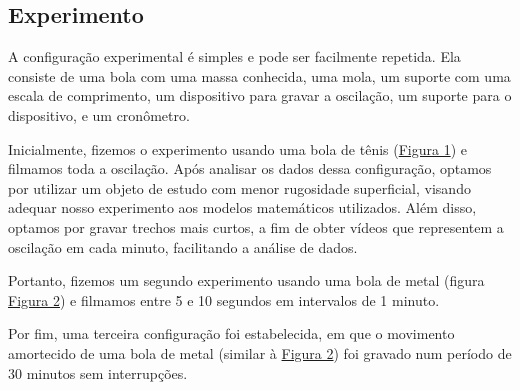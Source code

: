 \documentclass[a4paper, 12pt]{article}
\begin{document}
\begin{multicols}{2}
		\section{Experimento} \label{sec:experimento}
			\par A configuração experimental é simples e pode ser facilmente repetida. Ela consiste de uma bola com uma massa conhecida, uma mola, um suporte com uma escala de comprimento, um dispositivo para gravar a oscilação, um suporte para o dispositivo, e um cronômetro.
			\par Inicialmente, fizemos o experimento usando uma bola de tênis (\hyperref[img:tenis]{Figura 1}) e filmamos toda a oscilação. Após analisar os dados dessa configuração, optamos por utilizar um objeto de estudo com menor rugosidade superficial, visando adequar nosso experimento aos modelos matemáticos utilizados. Além disso, optamos por gravar trechos mais curtos, a fim de obter vídeos que representem a oscilação em cada minuto, facilitando a análise de dados.
			\par Portanto, fizemos um segundo experimento usando uma bola de metal (figura \hyperref[img:metal]{Figura 2}) e filmamos entre 5 e 10 segundos em intervalos de 1 minuto.
			\par Por fim, uma terceira configuração foi estabelecida, em que o movimento amortecido de uma bola de metal (similar à \hyperref[img:metal]{Figura 2}) foi gravado num período de 30 minutos sem interrupções.
			\begin{figure}[H] \label{img:tenis}
				\centering

\end{figure}
\end{multicols}
\end{document}
